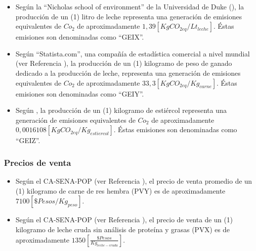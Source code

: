 \begin{itemize}
    \item Según la ``Nicholas school of environment'' de la Universidad de Duke (\cite{ecoduke}), la producción de un (1) litro de leche representa una generación de  emisiones equivalentes de $Co_{2}$ de aproximadamente $1,39[KgCO_{2eq}/Lt_{leche}]$. Éstas emisiones son denominadas como ``GEIX''.
    \item Según ``Statista.com'', una compañía de estadística comercial a nivel mundial (ver Referencia \cite{statista}), la producción de un (1) kilogramo de peso de ganado dedicado a la producción de leche, representa una generación de  emisiones equivalentes de $Co_{2}$ de aproximadamente $33,3[KgCO_{2eq}/Kg_{carne}]$. Éstas emisiones son denominadas como ``GEIY''.
    \item Según \cite{manure}, la producción de un (1) kilogramo de estiércol representa una generación de  emisiones equivalentes de $Co_{2}$ de aproximadamente $0,0016108[KgCO_{2eq}/Kg_{estiercol}]$. Éstas emisiones son denominadas como ``GEIZ''.
\end{itemize}


\subsubsection{Precios de venta}

\begin{itemize}
    \item Según el CA-SENA-POP (ver Referencia \cite{casena}), el precio  de venta promedio de un (1) kilogramo de carne de res hembra (PVY) es de aproximadamente $7100[\$Pesos/Kg_{peso}]$.
    \item Según el CA-SENA-POP (ver Referencia \cite{casena}), el precio de venta de un (1) kilogramo de leche cruda sin análisis de proteína y grasas (PVX) es de aproximadamente $1350[\frac{\$Pesos}{Kg_{leche-cruda}}]$.
\end{itemize}

